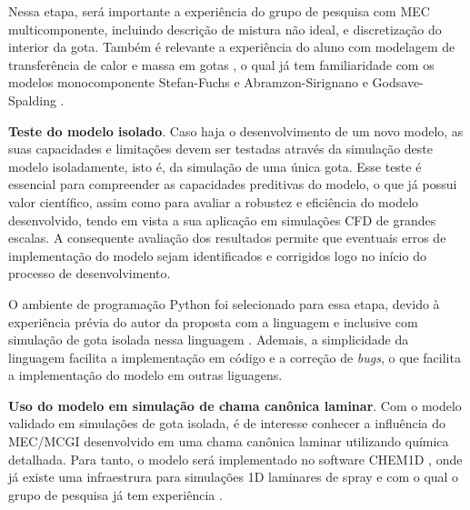 Nessa etapa, será importante a experiência do grupo de pesquisa com MEC multicomponente, incluindo descrição de mistura não ideal, e discretização do interior da gota.
Também é relevante a experiência do aluno com modelagem de transferência de calor e massa em gotas , o qual já tem familiaridade com os modelos monocomponente Stefan-Fuchs \cite{Glassman2008} e Abramzon-Sirignano \cite{Sirignano1989} e Godsave-Spalding \cite{Law1978}.

\textbf{Teste do modelo isolado}.
Caso haja o desenvolvimento de um novo modelo, as suas capacidades e limitações devem ser testadas através da simulação deste modelo isoladamente, isto é, da simulação de uma única gota.
Esse teste é essencial para compreender as capacidades preditivas do modelo, o que já possui valor científico, assim como para avaliar a robustez e eficiência do modelo desenvolvido, tendo em vista a sua aplicação em simulações CFD de grandes escalas.
A consequente avaliação dos resultados permite que eventuais erros de implementação do modelo sejam identificados e corrigidos logo no início do processo de desenvolvimento.

O ambiente de programação Python foi selecionado para essa etapa, devido à experiência prévia do autor da proposta com a linguagem e inclusive com simulação de gota isolada nessa linguagem \cite{HenningsJ2024MT}.
Ademais, a simplicidade da linguagem facilita a implementação em código e a correção de \emph{bugs}, o que facilita a implementação do modelo em outras liguagens.

\textbf{Uso do modelo em simulação de chama canônica laminar}.
Com o modelo validado em simulações de gota isolada, é de interesse conhecer a influência do MEC/MCGI desenvolvido em uma chama canônica laminar utilizando química detalhada.
Para tanto, o modelo será implementado no software CHEM1D \cite{Sommers1994PhD}, onde já existe uma infraestrura para simulações 1D laminares de spray \cite{Sommers1994PhD,vanOijen2002CTM,vanOijen2016PECS, SacomanoF2018CTM,SacomanoF2021Fluids} e com o qual o grupo de pesquisa já tem experiência \cite{SacomanoF2018CTM,SacomanoF2019IJHMT,SacomanoF2021Fluids,SacomanoF2024CF,SacomanoF2025CF}.

